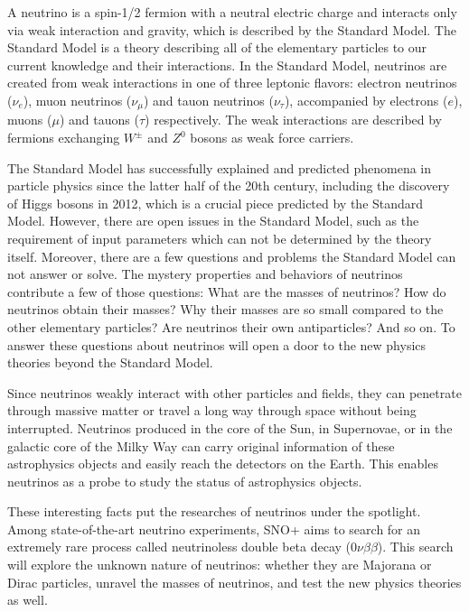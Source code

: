 
A neutrino is a spin-1/2 fermion with a neutral electric charge and interacts only via weak interaction and gravity, which is described by the Standard Model. The Standard Model is a theory describing all of the elementary particles to our current knowledge and their interactions.
In the Standard Model, neutrinos are created from weak interactions in one of three leptonic flavors:
electron neutrinos ($\nu_e$), muon neutrinos ($\nu_\mu$) and tauon neutrinos ($\nu_\tau$), accompanied by electrons ($e$), muons ($\mu$) and tauons ($\tau$) respectively. The weak interactions are described by fermions exchanging $W^{\pm}$ and $Z^0$ bosons as weak force carriers.

The Standard Model has successfully explained and predicted phenomena in particle physics since the latter half of the 20th century, including the discovery of Higgs bosons in 2012, which is a crucial piece predicted by the Standard Model. However, there are open issues in the Standard Model, such as the requirement of input parameters which can not be determined by the theory itself. Moreover, there are a few questions and problems the Standard Model can not answer or solve. The mystery properties and behaviors of neutrinos contribute a few of those questions: What are the masses of neutrinos? How do neutrinos obtain their masses? Why their masses are so small compared to the other elementary particles? Are neutrinos their own antiparticles? And so on. To answer these questions about neutrinos will open a door to the new physics theories beyond the Standard Model.

Since neutrinos weakly interact with other particles and fields, they can penetrate through massive matter or travel a long way through space without being interrupted. Neutrinos produced in the core of the Sun, in Supernovae, or in the galactic core of the Milky Way can carry original information of these astrophysics objects and easily reach the detectors on the Earth. This enables neutrinos as a probe to study the status of astrophysics objects.

These interesting facts put the researches of neutrinos under the spotlight. Among state-of-the-art neutrino experiments, SNO+ aims to search for an extremely rare process called neutrinoless double beta decay ($0\nu\beta\beta$). This search will explore the unknown nature of neutrinos: whether they are Majorana or Dirac particles, unravel the masses of neutrinos, and test the new physics theories as well.

